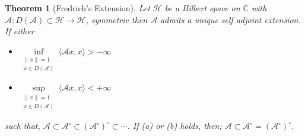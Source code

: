 \documentclass[12pt, oneside]{book}
\newtheorem{theo}{Theorem}[section]
\newcommand{\norm}[1]{\left\lVert#1\right\rVert}
\newcommand{\A}{\mathscr{A}}
\begin{document}
\begin{theo}[Fredrich's Extension]
Let $\mathscr{H}$ be a Hilbert space on $\mathbb{C}$ with $
\mathscr{A} : {D(\mathscr{A}) \subset \mathscr{H} \to \mathscr{H}}$, symmetric then $\mathscr{A}$ admits a unique self adjoint extension. If either 
\begin{itemize}
	\item [a.] $\inf\limits_{\substack{\norm{x}=1 \\ x \in D(\A)}} \langle \A x, x \rangle > -\infty$
	\item [b.] $\sup\limits_{\substack{\norm{x} = 1 \\ x \in D(\A)}} \langle \A x, x \rangle < +\infty$
	\end{itemize}
such that, $\mathscr{A}\subset \mathscr{A}^{\circ}\subset (\mathscr{A}^{\circ})^{\circ}\subset \cdots$. If (a) or (b) holds, then; $\mathscr{A}\subset \mathscr{A}^{\circ}=(\mathscr{A}^{\circ})^{\circ}$.

\end{theo}
\end{document}
